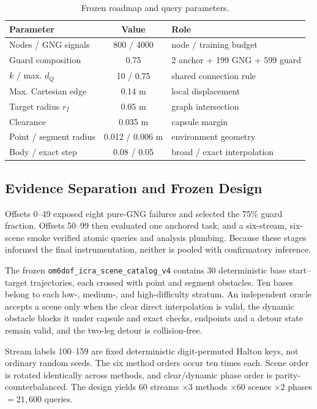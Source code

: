 \documentclass[letterpaper,10pt,conference]{ieeeconf}
\begin{document}
\begin{table}[t]
\caption{Frozen roadmap and query parameters.}
\label{tab:parameters}
\centering
\scriptsize
\setlength{\tabcolsep}{3pt}
\begin{tabular}{@{}lcl@{}}
\toprule
Parameter & Value & Role \\
\midrule
Nodes / GNG signals & 800 / 4000 & node / training budget \\
Guard composition & 0.75 & 2 anchor + 199 GNG + 599 guard \\
$k$ / max. $d_Q$ & 10 / 0.75 & shared connection rule \\
Max. Cartesian edge & 0.14 m & local displacement \\
Target radius $r_I$ & 0.05 m & graph intersection \\
Clearance & 0.035 m & capsule margin \\
Point / segment radius & 0.012 / 0.006 m & environment geometry \\
Body / exact step & 0.08 / 0.05 & broad / exact interpolation \\
\bottomrule
\end{tabular}
\end{table}

\subsection{Evidence Separation and Frozen Design}
Offsets 0--49 exposed eight pure-GNG failures and selected the 75\% guard fraction. Offsets 50--99 then evaluated one anchored task, and a six-stream, six-scene smoke verified atomic queries and analysis plumbing. Because these stages informed the final instrumentation, neither is pooled with confirmatory inference.

The frozen \texttt{om6dof\_icra\_scene\_catalog\_v4} contains 30 deterministic base start--target trajectories, each crossed with point and segment obstacles. Ten bases belong to each low-, medium-, and high-difficulty stratum. An independent oracle accepts a scene only when the clear direct interpolation is valid, the dynamic obstacle blocks it under capsule and exact checks, endpoints and a detour state remain valid, and the two-leg detour is collision-free.

Stream labels 100--159 are fixed deterministic digit-permuted Halton keys, not ordinary random seeds. The six method orders occur ten times each. Scene order is rotated identically across methods, and clear/dynamic phase order is parity-counterbalanced. The design yields $60$ streams $\times 3$ methods $\times 60$ scenes $\times 2$ phases $=21{,}600$ queries.
\end{document}
